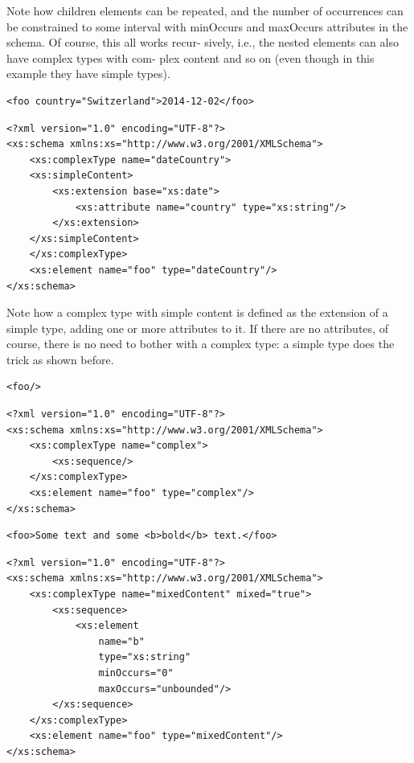 Note how children elements can be repeated, and the number of occurrences can be constrained to some interval with minOccurs and maxOccurs attributes in the schema. Of course, this all works recur- sively, i.e., the nested elements can also have complex types with com- plex content and so on (even though in this example they have simple types).

\begin{lstlisting}[style=XML,caption={XML Code Example with simple content.}]
<foo country="Switzerland">2014-12-02</foo>
\end{lstlisting}

\begin{lstlisting}[style=XML,caption={XML Schema for the above Example with simple content.}]
<?xml version="1.0" encoding="UTF-8"?>
<xs:schema xmlns:xs="http://www.w3.org/2001/XMLSchema">
    <xs:complexType name="dateCountry">
    <xs:simpleContent>
        <xs:extension base="xs:date">
            <xs:attribute name="country" type="xs:string"/>
        </xs:extension>
    </xs:simpleContent>
    </xs:complexType>
    <xs:element name="foo" type="dateCountry"/>
</xs:schema>
\end{lstlisting}

Note how a complex type with simple content is defined as the extension of a simple type, adding one or more attributes to it. If there are no attributes, of course, there is no need to bother with a complex type: a simple type does the trick as shown before.


\begin{lstlisting}[style=XML,caption={XML Code Example with empty content.}]
<foo/>
\end{lstlisting}

\begin{lstlisting}[style=XML,caption={XML Schema for the above Example with empty content.}]
<?xml version="1.0" encoding="UTF-8"?>
<xs:schema xmlns:xs="http://www.w3.org/2001/XMLSchema">
    <xs:complexType name="complex">
        <xs:sequence/>
    </xs:complexType>
    <xs:element name="foo" type="complex"/>
</xs:schema>
\end{lstlisting}


\begin{lstlisting}[style=XML,caption={XML Code Example with mixed content.}]
<foo>Some text and some <b>bold</b> text.</foo>
\end{lstlisting}

\begin{lstlisting}[style=XML,caption={XML Schema for the above Example with mixed content.}]
<?xml version="1.0" encoding="UTF-8"?>
<xs:schema xmlns:xs="http://www.w3.org/2001/XMLSchema">
    <xs:complexType name="mixedContent" mixed="true">
        <xs:sequence>
            <xs:element
                name="b"
                type="xs:string"
                minOccurs="0"
                maxOccurs="unbounded"/>
        </xs:sequence>
    </xs:complexType>
    <xs:element name="foo" type="mixedContent"/>
</xs:schema>
\end{lstlisting}

